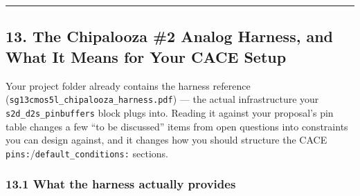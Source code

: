 \documentclass[
]{article}
\begin{document}
\begin{center}\rule{0.5\linewidth}{0.5pt}\end{center}

\hypertarget{the-chipalooza-2-analog-harness-and-what-it-means-for-your-cace-setup}{%
\subsection{13. The Chipalooza \#2 Analog Harness, and What It Means for
Your CACE
Setup}\label{the-chipalooza-2-analog-harness-and-what-it-means-for-your-cace-setup}}

Your project folder already contains the harness reference
(\texttt{sg13cmos5l\_chipalooza\_harness.pdf}) --- the actual
infrastructure your \texttt{s2d\_d2s\_pinbuffers} block plugs into.
Reading it against your proposal's pin table changes a few ``to be
discussed'' items from open questions into constraints you can design
against, and it changes how you should structure the CACE
\texttt{pins:}/\texttt{default\_conditions:} sections.

\hypertarget{what-the-harness-actually-provides}{%
\subsubsection{13.1 What the harness actually
provides}\label{what-the-harness-actually-provides}}
\end{document}
